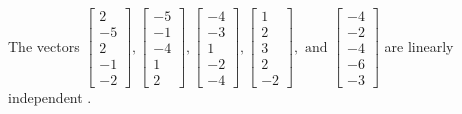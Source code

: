 \begin{exercise}
\begin{exerciseStatement}
  \end{exerciseStatement}
  \begin{exerciseAnswer}
   The vectors \(\left[\begin{array}{r}
2 \\
-5 \\
2 \\
-1 \\
-2
\end{array}\right] , \left[\begin{array}{r}
-5 \\
-1 \\
-4 \\
1 \\
2
\end{array}\right] , \left[\begin{array}{r}
-4 \\
-3 \\
1 \\
-2 \\
-4
\end{array}\right] , \left[\begin{array}{r}
1 \\
2 \\
3 \\
2 \\
-2
\end{array}\right] , \text{ and } \left[\begin{array}{r}
-4 \\
-2 \\
-4 \\
-6 \\
-3
\end{array}\right]\) are 
  	 linearly independent  .
  


  \end{exerciseAnswer}
\end{exercise}